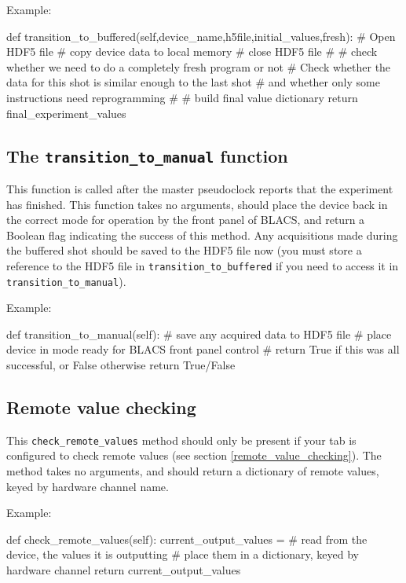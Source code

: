 \documentclass[12pt]{article}
\begin{document}
Example:
\begin{python}
    def transition_to_buffered(self,device_name,h5file,initial_values,fresh):
        # Open HDF5 file
        # copy device data to local memory
        # close HDF5 file
        #
        # check whether we need to do a completely fresh program or not
        # Check whether the data for this shot is similar enough to the last shot
        #       and whether only some instructions need reprogramming
        # 
        # build final value dictionary
        return final_experiment_values
\end{python}

\subsection{The \texttt{transition\_to\_manual} function}
This function is called after the master pseudoclock reports that the experiment has finished. 
This function takes no arguments, should place the device back in the correct mode for operation by the front panel of BLACS, and return a Boolean flag indicating the success of this method.
Any acquisitions made during the buffered shot should be saved to the HDF5 file now (you must store a reference to the HDF5 file in \texttt{transition\_to\_buffered} if you need to access it in \texttt{transition\_to\_manual}).

Example:
\begin{python}
    def transition_to_manual(self):
        # save any acquired data to HDF5 file
        # place device in mode ready for BLACS front panel control
        # return True if this was all successful, or False otherwise
        return True/False
\end{python}

\subsection{Remote value checking}\label{worker:remote_value_checking}
This \texttt{check\_remote\_values} method should only be present if your tab is configured to check remote values (see section \ref{remote_value_checking}).
The method takes no arguments, and should return a dictionary of remote values, keyed by hardware channel name.

Example:
\begin{python}
    def check_remote_values(self):
        current_output_values = {}
        # read from the device, the values it is outputting
        # place them in a dictionary, keyed by hardware channel
        return current_output_values
\end{python}
\end{document}
